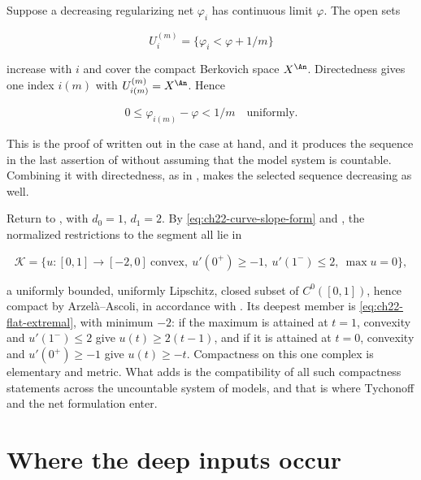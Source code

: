 \begin{example}
\label{ex:ch22-dini-selection}
Suppose a decreasing regularizing net \(\varphi_i\) has continuous limit
\(\varphi\).  The open sets

\[
                     U_i^{(m)}=\{\varphi_i<\varphi+1/m\}
\]

increase with \(i\) and cover the compact Berkovich space \(X^{\An}\).
Directedness gives one index \(i(m)\) with
\(U_{i(m)}^{(m)}=X^{\An}\).  Hence

\[
             0\leq\varphi_{i(m)}-\varphi<1/m
             \quad\text{uniformly}.
\]

This is the proof of  written out in the case at hand,
and it produces the sequence in the last assertion of
 without assuming that the model
system is countable.  Combining it with directedness, as in
, makes the selected sequence
decreasing as well.
\end{example}

\begin{example}
\label{ex:ch22-compactness-segment}
Return to , with \(d_0=1\), \(d_1=2\).  By
\eqref{eq:ch22-curve-slope-form} and
, the normalized restrictions to the
segment all lie in

\[
 \mathcal K=\bigl\{u:[0,1]\to[-2,0]\ \text{convex},\
       u'(0^+)\geq-1,\ u'(1^-)\leq2,\ \max u=0\bigr\},
\]

a uniformly bounded, uniformly Lipschitz, closed subset of
\(C^0([0,1])\), hence compact by Arzel\`a--Ascoli, in accordance with
\Cref{cor:ch22-arzela-ascoli}.  Its deepest member is
\eqref{eq:ch22-flat-extremal}, with minimum \(-2\): if the maximum is
attained at \(t=1\), convexity and \(u'(1^-)\leq2\) give
\(u(t)\geq2(t-1)\), and if it is attained at \(t=0\), convexity and
\(u'(0^+)\geq-1\) give \(u(t)\geq-t\).  Compactness on
this one complex is elementary and metric.  What
 adds is the compatibility of all such
compactness statements across the uncountable system of models, and that is
where Tychonoff and the net formulation enter.
\end{example}

\section{Where the deep inputs occur}
\label{sec:ch22-ledger}


